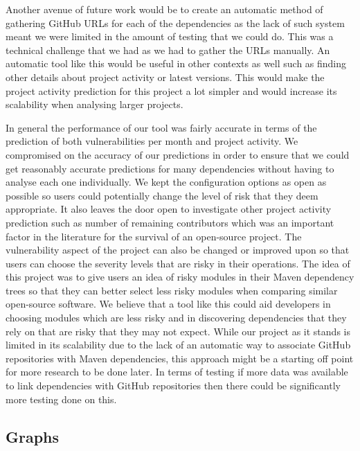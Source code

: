 \documentclass[conference]{IEEEtran}
\begin{document}
Another avenue of future work would be to create an automatic method of gathering GitHub URLs for each of the dependencies as the lack of such system meant we were limited in the amount of testing that we could do. This was a technical challenge that we had as we had to gather the URLs manually. An automatic tool like this would be useful in other contexts as well such as finding other details about project activity or latest versions. This would make the project activity prediction for this project a lot simpler and would increase its scalability when analysing larger projects. 

In general the performance of our tool was fairly accurate in terms of the prediction of both vulnerabilities per month and project activity. We compromised on the accuracy of our predictions in order to ensure that we could get reasonably accurate predictions for many dependencies without having to analyse each one individually. We kept the configuration options as open as possible so users could potentially change the level of risk that they deem appropriate. It also leaves the door open to investigate other project activity prediction such as number of remaining contributors which was an important factor in the literature for the survival of an open-source project. The vulnerability aspect of the project can also be changed or improved upon so that users can choose the severity levels that are risky in their operations. The idea of this project was to give users an idea of risky modules in their Maven dependency trees so that they can better select less risky modules when comparing similar open-source software. We believe that a tool like this could aid developers in choosing modules which are less risky and in discovering dependencies that they rely on that are risky that they may not expect. While our project as it stands is limited in its scalability due to the lack of an automatic way to associate GitHub repositories with Maven dependencies, this approach might be a starting off point for more research to be done later. In terms of testing if more data was available to link dependencies with GitHub repositories then there could be significantly more testing done on this. 




\appendices

\subsection{Graphs}
\label{Graphs}
\end{document}
